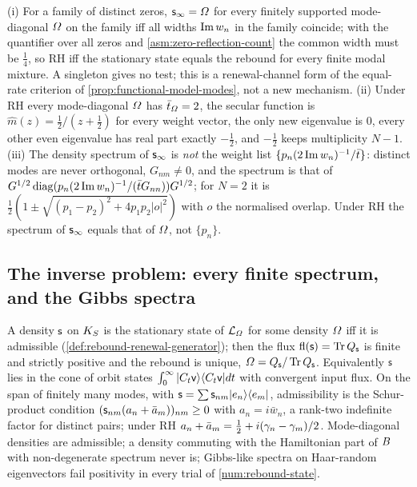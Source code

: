 \begin{proposition}
\label{prop:mode-diagonal-rebound-rh}
(i) For a family of distinct zeros, $\mathsf s_\infty = \varOmega$ for every finitely supported
mode-diagonal $\varOmega$ on the family iff all widths $\operatorname{Im} w_n$ in the family coincide; with the
quantifier over all zeros and \cref{asm:zero-reflection-count} the common width must be $\tfrac14$, so
RH iff the stationary state equals the rebound for every finite modal mixture. A singleton gives no
test; this is a renewal-channel form of the equal-rate criterion of \cref{prop:functional-model-modes},
not a new mechanism. (ii) Under RH every mode-diagonal $\varOmega$ has $\bar t_{\varOmega} = 2$, the secular
function is $\widehat m(z) = \tfrac12/(z+\tfrac12)$ for every weight vector, the only new eigenvalue is
$0$, every other even eigenvalue has real part exactly $-\tfrac12$, and $-\tfrac12$ keeps multiplicity
$N-1$. (iii) The density spectrum of $\mathsf s_\infty$ is \emph{not} the weight list $\{p_n(2\operatorname{Im} w_n)^{-1}
/\bar t\}$: distinct modes are never orthogonal, $G_{nm}\ne0$, and the spectrum is that of
$G^{1/2}\operatorname{diag}(p_n(2\operatorname{Im} w_n)^{-1}/(\bar t G_{nn}))G^{1/2}$; for $N = 2$ it is
$\tfrac12(1\pm\sqrt{(p_1-p_2)^2+4p_1p_2|o|^2})$ with $o$ the normalised overlap. Under RH the spectrum
of $\mathsf s_\infty$ equals that of $\varOmega$, not $\{p_n\}$.
\end{proposition}

\subsection{The inverse problem: every finite spectrum, and the Gibbs spectra}

\begin{theorem}
\label{thm:rebound-admissibility}
A density $\mathsf s$ on $K_S$ is the stationary state of $\mathcal L_{\varOmega}$ for some density $\varOmega$ iff
it is admissible (\cref{def:rebound-renewal-generator}); then the flux $\mathrm{fl}(\mathsf s) = \operatorname{Tr} Q_\mathsf s$ is
finite and strictly positive and the rebound is unique, $\varOmega = Q_\mathsf s/\operatorname{Tr} Q_\mathsf s$. Equivalently
$\mathsf s$ lies in the cone of orbit states $\int_0^\infty|C_t\mathsf v\rangle\langle C_t\mathsf v|dt$ with
convergent input flux. On the span of finitely many modes, with $\mathsf s = \sum\mathsf s_{nm}|e_n\rangle
\langle e_m|$, admissibility is the Schur-product condition $(\mathsf s_{nm}(a_n+\bar a_m))_{nm}\ge0$ with
$a_n = i\bar w_n$, a rank-two indefinite factor for distinct pairs; under RH $a_n+\bar a_m = \tfrac12 +
i(\gamma_{n}-\gamma_{m})/2$. Mode-diagonal densities are admissible; a density commuting with the
Hamiltonian part of $B$ with non-degenerate spectrum never is; Gibbs-like spectra on Haar-random
eigenvectors fail positivity in every trial of \cref{num:rebound-state}.
\end{theorem}

